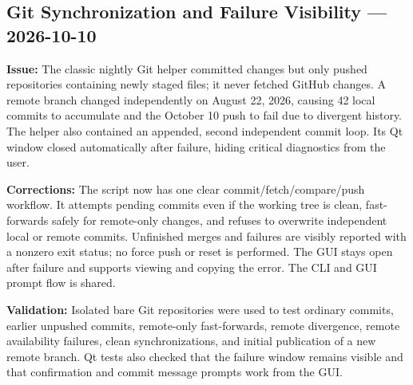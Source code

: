 \documentclass[a4paper]{article}
\title{}
\date{}
\author{Mohammad Rahmani}
\begin{document}
   \maketitle

   \begin{preview}
\section*{Git Synchronization and Failure Visibility --- 2026-10-10}
\textbf{Issue:} The classic nightly Git helper committed changes but only
pushed repositories containing newly staged files; it never fetched
GitHub changes. A remote branch changed independently on August 22,
2026, causing 42 local commits to accumulate and the October 10 push
to fail due to divergent history. The helper also contained an appended,
second independent commit loop. Its Qt window closed automatically
after failure, hiding critical diagnostics from the user.

\textbf{Corrections:} The script now has one clear commit/fetch/compare/push
workflow. It attempts pending commits even if the working tree is clean,
fast-forwards safely for remote-only changes, and refuses to overwrite
independent local or remote commits. Unfinished merges and failures
are visibly reported with a nonzero exit status; no force push or
reset is performed. The GUI stays open after failure and supports
viewing and copying the error. The CLI and GUI prompt flow is shared.

\textbf{Validation:} Isolated bare Git repositories were used to test
ordinary commits, earlier unpushed commits, remote-only fast-forwards,
remote divergence, remote availability failures, clean synchronizations,
and initial publication of a new remote branch. Qt tests also checked
that the failure window remains visible and that confirmation and
commit message prompts work from the GUI.

   \end{preview}

   
   
\end{document}
